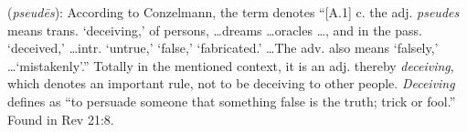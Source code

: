 \item[Deceiving,]

(\textit{pseudēs}):
According to Conzelmann, the term denotes ``[A.1] c. the adj. \emph{pseudes} means trans. `deceiving,' of persons, \ldots dreams \ldots oracles \ldots, and in the pass. `deceived,' \ldots intr. `untrue,' `false,' `fabricated.' \ldots The adv. also means `falsely,' \ldots `mistakenly'.'' Totally in the mentioned context, it is an adj. thereby \emph{deceiving}, which denotes an important rule, not to be deceiving to other people. \emph{Deceiving} defines as ``to persuade someone that something false is the truth; trick or fool.''
Found in Rev 21:8.
